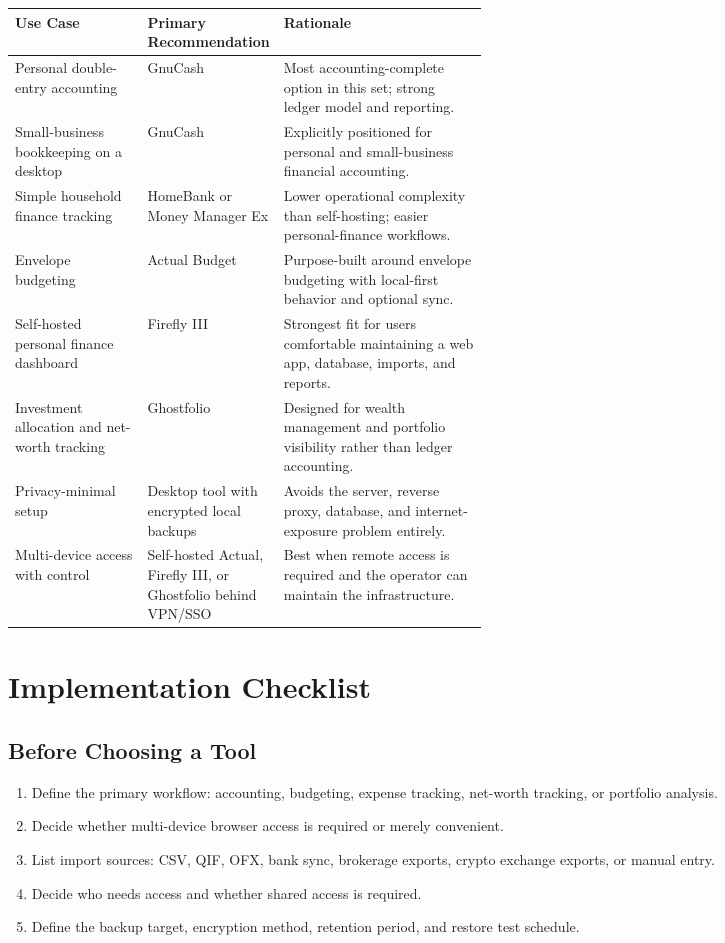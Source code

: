 \documentclass[11pt]{article}
\begin{document}
\begin{tabularx}{\linewidth}{>{\RaggedRight\arraybackslash}p{0.28\linewidth} >{\RaggedRight\arraybackslash}p{0.27\linewidth} >{\RaggedRight\arraybackslash}X}
\rowcolor{headergray}\textbf{Use Case} & \textbf{Primary Recommendation} & \textbf{Rationale} \\
\toprule
Personal double-entry accounting & GnuCash & Most accounting-complete option in this set; strong ledger model and reporting. \\
Small-business bookkeeping on a desktop & GnuCash & Explicitly positioned for personal and small-business financial accounting. \\
Simple household finance tracking & HomeBank or Money Manager Ex & Lower operational complexity than self-hosting; easier personal-finance workflows. \\
Envelope budgeting & Actual Budget & Purpose-built around envelope budgeting with local-first behavior and optional sync. \\
Self-hosted personal finance dashboard & Firefly III & Strongest fit for users comfortable maintaining a web app, database, imports, and reports. \\
Investment allocation and net-worth tracking & Ghostfolio & Designed for wealth management and portfolio visibility rather than ledger accounting. \\
Privacy-minimal setup & Desktop tool with encrypted local backups & Avoids the server, reverse proxy, database, and internet-exposure problem entirely. \\
Multi-device access with control & Self-hosted Actual, Firefly III, or Ghostfolio behind VPN/SSO & Best when remote access is required and the operator can maintain the infrastructure. \\
\bottomrule
\end{tabularx}

\section{Implementation Checklist}

\subsection{Before Choosing a Tool}

\begin{enumerate}
  \item Define the primary workflow: accounting, budgeting, expense tracking, net-worth tracking, or portfolio analysis.
  \item Decide whether multi-device browser access is required or merely convenient.
  \item List import sources: CSV, QIF, OFX, bank sync, brokerage exports, crypto exchange exports, or manual entry.
  \item Decide who needs access and whether shared access is required.
  \item Define the backup target, encryption method, retention period, and restore test schedule.
\end{enumerate}
\end{document}
